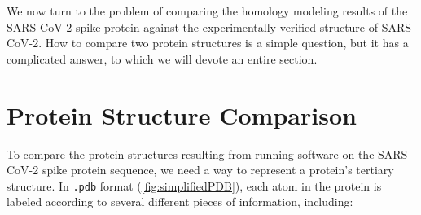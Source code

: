 \begin{note}\end{note}
	
We now turn to the problem of comparing the homology modeling results of the SARS-CoV-2 spike protein against the experimentally verified structure of SARS-CoV-2. How to compare two protein structures is a simple question, but it has a complicated answer, to which we will devote an entire section.\\

\FloatBarrier
{}

\section{Protein Structure Comparison}
\label{sec:accuracy}

%

To compare the protein structures resulting from running software on the SARS-CoV-2 spike protein sequence, we need a way to represent a protein's tertiary structure. In \texttt{.pdb} format (\autoref{fig:simplifiedPDB}), each atom in the protein is labeled according to several different pieces of information, including:


